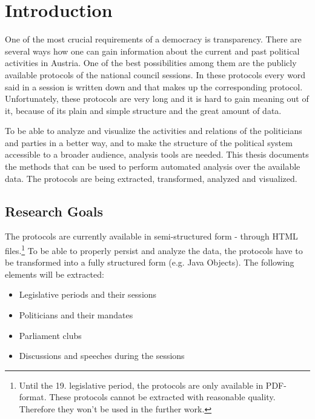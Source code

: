 \chapter{Introduction}
\label{sec:introduction}
One of the most crucial requirements of a democracy is transparency. There are several ways how one can gain information about the current and past political activities in Austria. One of the best possibilities among them are the publicly available protocols of the national council sessions. In these protocols every word said in a session is written down and that makes up the corresponding protocol. Unfortunately, these protocols are very long and it is hard to gain meaning out of it, because of its plain and simple structure and the great amount of data.

To be able to analyze and visualize the activities and relations of the politicians and parties in a better way, and to make the structure of the political system accessible to a broader audience, analysis tools are needed. This thesis documents the methods that can be used to perform automated analysis over the available data. The protocols are being extracted, transformed, analyzed and visualized.

\section{Research Goals}
The protocols are currently available in semi-structured form - through HTML files.\footnote{Until the 19. legislative period, the protocols are only available in PDF-format. These protocols cannot be extracted with reasonable quality. Therefore they won't be used in the further work.} To be able to properly persist and analyze the data, the protocols have to be transformed into a fully structured form (e.g. Java Objects). The following elements will be extracted:
\begin{itemize}
  \item Legislative periods and their sessions
  \item Politicians and their mandates
  \item Parliament clubs
  \item Discussions and speeches during the sessions
\end{itemize}

